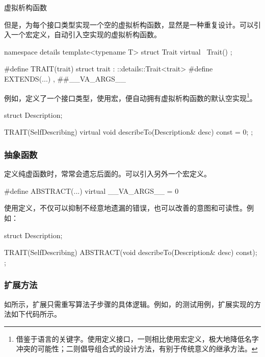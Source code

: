 \begin{content}
\begin{episode}{虚拟析构函数}
\begin{content}
但是，为每个接口类型实现一个空的虚拟析构函数，显然是一种重复设计。可以引入一个宏定义，自动引入空实现的虚拟析构函数。

 \begin{c++}
namespace details {
  template<typename T>
  struct Trait {
    virtual ~Trait() {}
  };
}

#define TRAIT(trait)  struct trait : ::details::Trait<trait>
#define EXTENDS(...) , ##__VA_ARGS__
 \end{c++}

例如，定义了一个接口类型，使用宏，便自动拥有虚拟析构函数的默认空实现\footnote{借鉴于语言的关键字。使用定义接口，一则相比使用宏定义，极大地降低名字冲突的可能性；二则倡导组合式的设计方法，有别于传统意义的继承方法。}。

 \begin{c++}
struct Description;

TRAIT(SelfDescribing) {
  virtual void describeTo(Description& desc) const = 0;
};
 \end{c++}

\subsubsection{抽象函数}

定义纯虚函数时，常常会遗忘后面的。可以引入另外一个宏定义。

 \begin{c++}
#define ABSTRACT(...) virtual __VA_ARGS__ = 0
 \end{c++}

使用定义，不仅可以抑制不经意地遗漏的错误，也可以改善的意图和可读性。例如：

\begin{c++}
struct Description;

TRAIT(SelfDescribing) {
  ABSTRACT(void describeTo(Description& desc) const);
};
\end{c++}

\end{content}
\end{episode}

\subsubsection{扩展方法}

如所示，扩展只需重写算法子步骤的具体逻辑。例如，的测试用例，扩展实现的方法如下代码所示。


\end{content}

